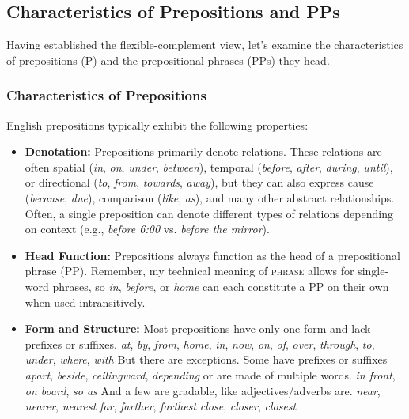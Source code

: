 \subsection{Characteristics of Prepositions and PPs}\label{sec:preps}

Having established the flexible-complement view, let's examine the characteristics of prepositions (P) and the prepositional phrases (PPs) they head.

\subsubsection*{Characteristics of Prepositions}

English prepositions typically exhibit the following properties:

\begin{itemize}
    \item \textbf{Denotation:} Prepositions primarily denote relations. These relations are often spatial (\textit{in}, \textit{on}, \textit{under}, \textit{between}), temporal (\textit{before}, \textit{after}, \textit{during}, \textit{until}), or directional (\textit{to}, \textit{from}, \textit{towards}, \textit{away}), but they can also express cause (\textit{because}, \textit{due}), comparison (\textit{like}, \textit{as}), and many other abstract relationships. Often, a single preposition can denote different types of relations depending on context (e.g., \textit{before 6:00} vs. \textit{before the mirror}).
    \item \textbf{Head Function:} Prepositions always function as the head of a prepositional phrase (PP). Remember, my technical meaning of \textsc{phrase} allows for single-word phrases, so \textit{in}, \textit{before}, or \textit{home} can each constitute a PP on their own when used intransitively.
    \item \textbf{Form and Structure:} Most prepositions have only one form and lack prefixes or suffixes.
    \ea \textit{at}, \textit{by}, \textit{from}, \textit{home}, \textit{in}, \textit{now}, \textit{on}, \textit{of}, \textit{over}, \textit{through}, \textit{to}, \textit{under}, \textit{where}, \textit{with} \label{ex:bareprep}
    \z
    But there are exceptions. Some have prefixes or suffixes 
    \ea  \textit{apart}, \textit{beside}, \textit{ceilingward}, \textit{depending} \label{ex:compoundprep}
    \z
    or are made of multiple words.
    \ea \textit{in front}, \textit{on board}, \textit{so as} \label{ex:complexprep}
    \z
    And a few are gradable, like adjectives/adverbs are.
    \ea 
        \ea \textit{near}, \textit{nearer}, \textit{nearest}
        \ex\textit{far}, \textit{farther}, \textit{farthest}
        \ex\textit{close}, \textit{closer}, \textit{closest}
        \z
    \z
\end{itemize}



